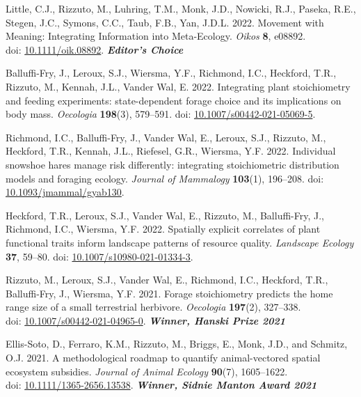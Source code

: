 \begin{etaremune}[topsep=0pt,itemsep=1pt,partopsep=0pt,parsep=0pt]
  \item Little, C.J.\textsuperscript{\textdagger}, \textcolor{awesome}{Rizzuto, M.}\textsuperscript{\textdagger}, Luhring, T.M., Monk, J.D., Nowicki, R.J., Paseka, R.E., Stegen, J.C., Symons, C.C., Taub, F.B., Yan, J.D.L. 2022. Movement with Meaning: Integrating Information into Meta-Ecology. \emph{Oikos} \textbf{8}, e08892.\\ doi: \href{https://doi.org/10.1111/oik.08892}{10.1111/oik.08892}. \null\hfill\textbf{\textit{Editor's Choice}}
  \item Balluffi-Fry, J., Leroux, S.J., Wiersma, Y.F., Richmond, I.C., Heckford, T.R., \textcolor{awesome}{Rizzuto, M.}, Kennah, J.L., Vander Wal, E. 2022. Integrating plant stoichiometry and feeding experiments: state-dependent forage choice and its implications on body mass. \emph{Oecologia} \textbf{198}(3), 579--591. doi: \href{https://rdcu.be/cAY5a}{10.1007/s00442-021-05069-5}.
  \item Richmond, I.C., Balluffi-Fry, J., Vander Wal, E., Leroux, S.J., \textcolor{awesome}{Rizzuto, M.}, Heckford, T.R., Kennah, J.L., Riefesel, G.R., Wiersma, Y.F. 2022. Individual snowshoe hares manage risk differently: integrating stoichiometric distribution models and foraging ecology. \emph{Journal of Mammalogy} \textbf{103}(1), 196--208. doi: \href{https://academic.oup.com/jmammal/advance-article/doi/10.1093/jmammal/gyab130/6441781?guestAccessKey=8f89e422-7fb9-4ce9-a9dc-ccf46f3dd0cc}{10.1093/jmammal/gyab130}.
  \item Heckford, T.R., Leroux, S.J., Vander Wal, E., \textcolor{awesome}{Rizzuto, M.}, Balluffi-Fry, J., Richmond, I.C., Wiersma, Y.F. 2022. Spatially explicit correlates of plant functional traits inform landscape patterns of resource quality. \emph{Landscape Ecology} \textbf{37}, 59--80. doi: \href{https://doi.org/10.1007/s10980-021-01334-3}{10.1007/s10980-021-01334-3}.
  \item \textcolor{awesome}{Rizzuto, M.}, Leroux, S.J., Vander Wal, E., Richmond, I.C., Heckford, T.R., Balluffi-Fry, J., Wiersma, Y.F. 2021. Forage stoichiometry predicts the home range size of a small terrestrial herbivore. \emph{Oecologia} \textbf{197}(2), 327--338.\\ doi: \href{https://rdcu.be/cSX31}{10.1007/s00442-021-04965-0}. \null\hfill\textbf{\textit{Winner, Hanski Prize 2021}}
  \item Ellis-Soto, D.\textsuperscript{\textdagger}, Ferraro, K.M.\textsuperscript{\textdagger}, \textcolor{awesome}{Rizzuto, M.}, Briggs, E., Monk, J.D., and Schmitz, O.J. 2021. A methodological roadmap to quantify animal-vectored spatial ecosystem subsidies. \emph{Journal of Animal Ecology} \textbf{90}(7), 1605--1622.\\ doi: \href{https://doi.org/10.1111/1365-2656.13538}{10.1111/1365-2656.13538}. \null\hfill\textbf{\textit{Winner, Sidnie Manton Award 2021}}

\end{etaremune}
